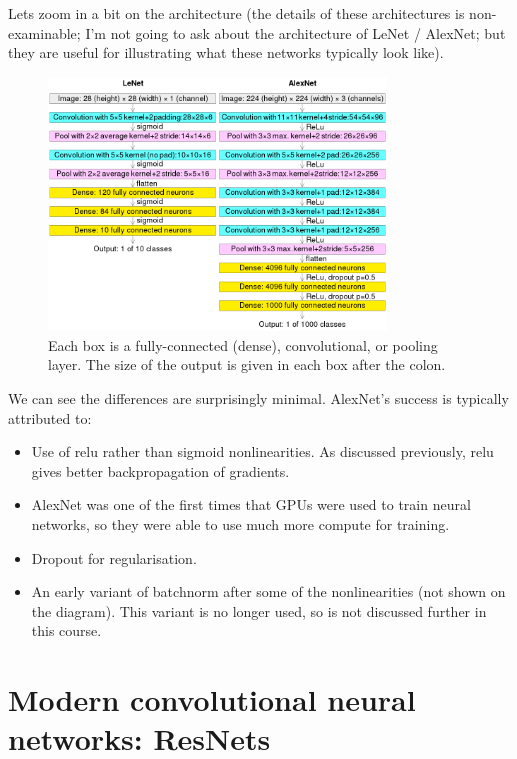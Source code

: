 \documentclass{article}
\begin{document}
Lets zoom in a bit on the architecture (the details of these architectures is non-examinable; I'm not going to ask about the architecture of LeNet / AlexNet; but they are useful for illustrating what these networks typically look like).
\begin{figure}[H]
  \centering
  \includegraphics[width=0.8\textwidth]{lenet_vs_alexnet}
  \caption{\label{fig:lenet_vs_alexnet} Each box is a fully-connected (dense), convolutional, or pooling layer.  The size of the output is given in each box after the colon.
  }
\end{figure}
We can see the differences are surprisingly minimal.
AlexNet's success is typically attributed to:
\begin{itemize}
  \item Use of relu rather than sigmoid nonlinearities.  As discussed previously, relu gives better backpropagation of gradients.
  \item AlexNet was one of the first times that GPUs were used to train neural networks, so they were able to use much more compute for training.
  \item Dropout for regularisation.
  \item An early variant of batchnorm after some of the nonlinearities (not shown on the diagram).
  This variant is no longer used, so is not discussed further in this course.
\end{itemize}

\FloatBarrier
\clearpage
\section{Modern convolutional neural networks: ResNets}
\end{document}
